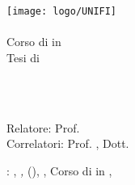 \begin{titlepage}
\begin{center}

\large
\hfill
\vfill

\texttt{[image: logo/UNIFI]} \\
\myFaculty \\
Corso di \myDegreeLevel in \myDegree \\
\vspace{0.5cm}
\vspace{0.5cm}    
Tesi di \myDegreeLevel

\vfill

\begingroup
\color{Maroon}
\spacedallcaps{\myItalianTitle} \\ $\ $\\
\spacedallcaps{\myEnglishTitle} \\ 	
\bigskip
\endgroup
      
\spacedlowsmallcaps{\myName}

\vfill 
\vfill
      
Relatore: Prof. \emph{\myRelatore} \\
Correlatori: Prof. \emph{\myCorrelatore}, Dott. \emph{\myOtherCorrelatore}
      
\vfill
\vfill

\myYear

\vfill 
                     
\end{center}        
\end{titlepage} 
 
\newpage
\thispagestyle{empty}
\hfill
\vfill
\noindent
\myLicense: \myName, \textit{\myItalianTitle,} \myVersione (\myTime), \myUni, Corso di \myDegreeLevel in \myDegree, \myYear